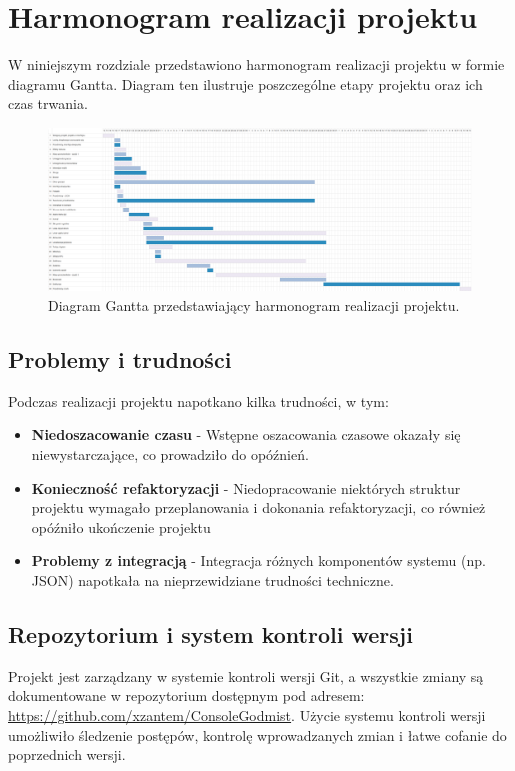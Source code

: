 ﻿%
\newpage
\chapter{Harmonogram realizacji projektu}

W niniejszym rozdziale przedstawiono harmonogram realizacji projektu w formie diagramu Gantta. Diagram ten ilustruje poszczególne etapy projektu oraz ich czas trwania.

\begin{figure}[h]
    \centering
    \includegraphics[width=\textwidth]{figures/gantt.png}
    \caption{Diagram Gantta przedstawiający harmonogram realizacji projektu.}
    \label{fig:gantt_chart}
\end{figure}

\section{Problemy i trudności}
Podczas realizacji projektu napotkano kilka trudności, w tym:
\begin{itemize}
    \item \textbf{Niedoszacowanie czasu} - Wstępne oszacowania czasowe okazały się niewystarczające, co prowadziło do opóźnień.
    \item \textbf{Konieczność refaktoryzacji} - Niedopracowanie niektórych struktur projektu wymagało przeplanowania i dokonania refaktoryzacji, co również opóźniło ukończenie projektu
    \item \textbf{Problemy z integracją} - Integracja różnych komponentów systemu (np. JSON) napotkała na nieprzewidziane trudności techniczne.
\end{itemize}

\section{Repozytorium i system kontroli wersji}
Projekt jest zarządzany w systemie kontroli wersji Git, a wszystkie zmiany są dokumentowane w repozytorium dostępnym pod adresem: \url{https://github.com/xzantem/ConsoleGodmist}. 
Użycie systemu kontroli wersji umożliwiło śledzenie postępów, kontrolę wprowadzanych zmian i łatwe cofanie do poprzednich wersji.


